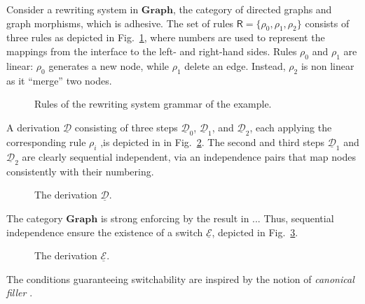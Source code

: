 \documentclass[a4paper,UKenglish,cleveref,pdftex,thm-restate,numberwithinsect,anonymous]{lipics}
\newcommand{\cat}[1]{\ensuremath{\mathbf{#1}}}
\def\R{\mathsf{R}}
\newcommand{\dder}[1]{\mathscr{#1}}
\newcommand{\der}[1]{\underline{\dder{#1}}}
\begin{document}
\begin{example}
  \label{ex:seq-ind}
  Consider a rewriting system in $\cat{Graph}$, the category of
  directed graphs and graph morphisms, which is adhesive. The set of
  rules $\R = \{ \rho_0, \rho_1, \rho_2\}$ consists of three rules as
  depicted in Fig.~\ref{fi:rules}, where numbers are used to represent
  the mappings from the interface to the left- and right-hand
  sides. Rules $\rho_0$ and $\rho_1$ are linear: $\rho_0$ generates a
  new node, while $\rho_1$ delete an edge. Instead, $\rho_2$ is non
  linear as it ``merge'' two nodes.

  \begin{figure}
    
    
    \caption{Rules of the rewriting system grammar of the example.}
    \label{fi:rules}
  \end{figure}
  
  A derivation $\der{D}$ consisting of three steps $\der{D}_0$,
  $\der{D}_1$, and $\der{D}_2$, each applying the corresponding rule
  $\rho_i$ ,is depicted in in Fig.~\ref{fi:derD}. The second and third
  steps $\der{D}_1$ and $\der{D}_2$ are clearly sequential
  independent, via an independence pairs that map nodes consistently
  with their numbering.
  
  \begin{figure}
    
    \caption{The derivation $\der{D}$.}
    \label{fi:derD}
  \end{figure}

  The category $\cat{Graph}$ is strong enforcing by the result in ...  Thus,
  sequential independence ensure the existence of a switch $\der{E}$,
  depicted in Fig.~\ref{fi:derE}.
  \begin{figure}
    
    \caption{The derivation $\der{E}$.}
    \label{fi:derE}
  \end{figure}
\end{example}
\fi 

The conditions guaranteeing switchability are inspired
by the notion of \emph{canonical filler}
\cite{heindel2009category}.
\end{document}
